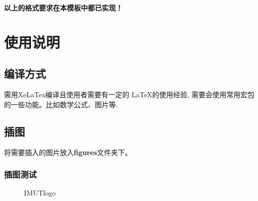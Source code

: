 \documentclass{imutthesis}
\begin{document}
{\color{red} \textbf{以上的格式要求在本模板中都已实现！}}

\section{使用说明}
\subsection{编译方式}
需用XeLaTex编译且使用者需要有一定的 \LaTeX 的使用经验, 需要会使用常用宏包的一些功能。比如数学公式、图片等. 
\subsection{插图}
将需要插入的图片放入\textbf{figures}文件夹下。
\subsubsection{插图测试}
\begin{figure}[H]
	\centering
	\quad
	\quad
	\quad
	\caption{IMUTlogo}
\end{figure}
\end{document}
